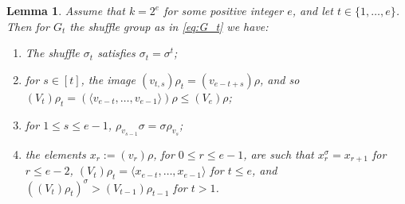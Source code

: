 \documentclass[12pt]{amsart}
\newtheorem{lem}[thm]{Lemma}
\theoremstyle{remark}
\theoremstyle{definition}
\begin{document}
\begin{lem} \label{lem:power of s}
Assume that $k = 2^e$ for some positive integer $e$, and let $t \in \{1, \ldots, e\}$. Then for
$G_t$ the shuffle group as in \eqref{eq:G_t} we have:
\begin{enumerate}

\item[(a)] The shuffle $\sigma_t$ satisfies $\sigma_t = \sigma^t$; 

\item[(b)] for $s\in [t]$, the image $(v_{t,s})\rho_{t}=(v_{e-t+s})\rho$, and so 
$(V_t)\rho_t = (\langle v_{e-t},\dots, v_{e-1}\rangle)\rho \leqslant (V_e)\rho$;

\item[(c)] for $1\leqslant s\leqslant e-1$, $\rho_{v_{s-1}}\sigma = \sigma\rho_{v_s}$;

\item[(d)] the elements $x_r:=(v_{r})\rho$,  for $0\leqslant r\leqslant e-1$, are such that $x_r^\sigma = x_{r+1}$ for $r\leqslant e-2$, 
$(V_t)\rho_t =\langle x_{e-t},\dots,x_{e-1}\rangle$ for $t\leqslant e$, and $((V_t)\rho_t)^\sigma >  (V_{t-1})\rho_{t-1}$ for $t>1$.
\end{enumerate} 
\end{lem}
\end{document}
